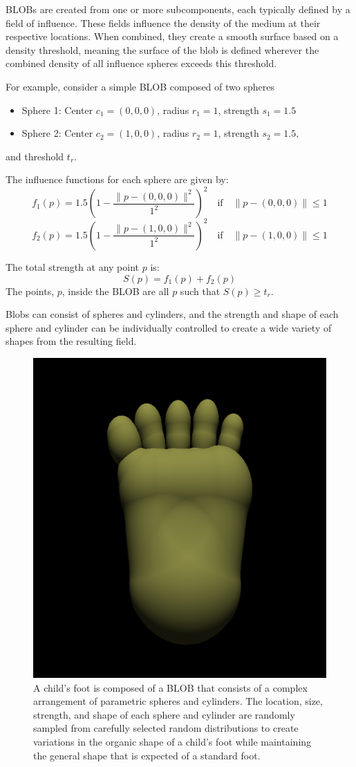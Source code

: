 \documentclass{article}
\begin{document}
BLOBs are created from one or more subcomponents, each typically defined by a field of influence. These fields influence the density of the medium at their respective locations. When combined, they create a smooth surface based on a density threshold, meaning the surface of the blob is defined wherever the combined density of all influence spheres exceeds this threshold.

For example, consider a simple BLOB composed of two spheres
\begin{itemize}
    \item Sphere 1: Center $c_1 = (0, 0, 0)$, radius $r_1 = 1$, strength $s_1 = 1.5$
    \item Sphere 2: Center $c_2 = (1, 0, 0)$, radius $r_2 = 1$, strength $s_2 = 1.5,$
\end{itemize}
and threshold $t_r$.

The influence functions for each sphere are given by:
$$
f_1(p) = 1.5 \left( 1 - \frac{\| p - (0, 0, 0) \|^2}{1^2} \right)^2 \quad \text{if} \quad \| p - (0, 0, 0) \| \leq 1
$$
$$
f_2(p) = 1.5 \left( 1 - \frac{\| p - (1, 0, 0) \|^2}{1^2} \right)^2 \quad \text{if} \quad \| p - (1, 0, 0) \| \leq 1
$$

The total strength at any point $p$ is:
$$
S(p) = f_1(p) + f_2(p)
$$
The points, $p$, inside the BLOB are all $p$ such that $S(p) \geq t_r$.

Blobs can consist of spheres and cylinders, and the strength and shape of each sphere and cylinder can be individually controlled to create a wide variety of shapes from the resulting field.

\begin{figure}[]
    \centering
    \includegraphics[width=.4\textwidth]{plots/foot2.png}
    \caption{A child's foot is composed of a BLOB that consists of a complex arrangement of parametric spheres and cylinders. The location, size, strength, and shape of each sphere and cylinder are randomly sampled from carefully selected random distributions to create variations in the organic shape of a child's foot while maintaining the general shape that is expected of a standard foot.}
    \label{fig:child_0}
\end{figure}
\end{document}
